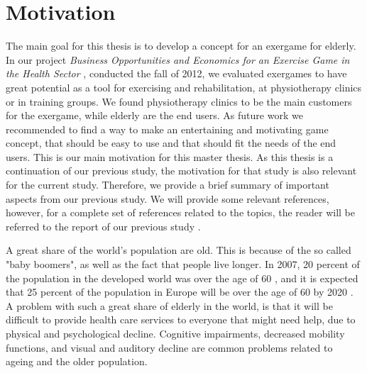 \chapter{Motivation}
\label{chap:background}

The main goal for this thesis is to develop a concept for an exergame for elderly. In our project \emph{Business Opportunities and Economics for an Exercise Game in the Health Sector} \cite{project}, conducted the fall of 2012, we evaluated exergames to have great potential as a tool for exercising and rehabilitation, at physiotherapy clinics or in training groups. We found physiotherapy clinics to be the main customers for the exergame, while elderly are the end users. As future work we recommended to find a way to make an entertaining and motivating game concept, that should be easy to use and that should fit the needs of the end users. This is our main motivation for this master thesis. As this thesis is a continuation of our previous study, the motivation for that study is also relevant for the current study. Therefore, we provide a brief summary of important aspects from our previous study. We will provide some relevant references, however, for a complete set of references related to the topics, the reader will be referred to the report of our previous study \cite{project}.

A great share of the world's population are old. This is because of the so called "baby boomers", as well as the fact that people live longer. In 2007, 20 percent of the population in the developed world was over the age of 60 \cite{dickinson2007methods}, and it is expected that 25 percent of the population in Europe will be over the age of 60 by 2020 \cite{ijsselsteijn2007digital}. A problem with such a great share of elderly in the world, is that it will be difficult to provide health care services to everyone that might need help, due to physical and psychological decline. Cognitive impairments, decreased mobility functions, and visual and auditory decline are common problems related to ageing and the older population.

